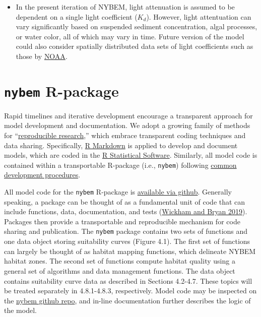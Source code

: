 \documentclass[
]{book}
\begin{document}
\begin{itemize}
\item
  In the present iteration of NYBEM, light attenuation is assumed to be dependent on a single light coefficient (\(K_{d}\)). However, light attentuation can vary significantly based on suspended sediment concentration, algal processes, or water color, all of which may vary in time. Future version of the model could also consider spatially distributed data sets of light coefficients such as those by \href{https://www.fisheries.noaa.gov/inport/item/66148}{NOAA}.
\end{itemize}

\hypertarget{nybem-r-package}{%
\section{\texorpdfstring{\texttt{nybem} R-package}{nybem R-package}}\label{nybem-r-package}}

Rapid timelines and iterative development encourage a transparent approach for model development and documentation. We adopt a growing family of methods for ``\href{https://ropensci.github.io/reproducibility-guide/sections/introduction/}{reproducible research},'' which embrace transparent coding techniques and data sharing. Specifically, \href{https://rmarkdown.rstudio.com/}{R Markdown} is applied to develop and document models, which are coded in the \href{https://cran.r-project.org/}{R Statistical Software}. Similarly, all model code is contained within a transportable R-package (i.e., \texttt{nybem}) following \href{https://r-pkgs.org/}{common development procedures}.

All model code for the \texttt{nybem} R-package is \href{https://github.com/MVR-GIS/nybem}{available via github}. Generally speaking, a package can be thought of as a fundamental unit of code that can include functions, data, documentation, and tests (\href{https://r-pkgs.org/}{Wickham and Bryan 2019}). Packages then provide a transportable and reproducible mechanism for code sharing and publication. The \texttt{nybem} package contains two sets of functions and one data object storing suitability curves (Figure 4.1). The first set of functions can largely be thought of as habitat mapping functions, which delineate NYBEM habitat zones. The second set of functions compute habitat quality using a general set of algorithms and data management functions. The data object contains suitability curve data as described in Sections 4.2-4.7. These topics will be treated separately in 4.8.1-4.8.3, respectively. Model code may be inspected on the \href{https://github.com/MVR-GIS/nybem}{nybem github repo}, and in-line documentation further describes the logic of the model.
\end{document}
